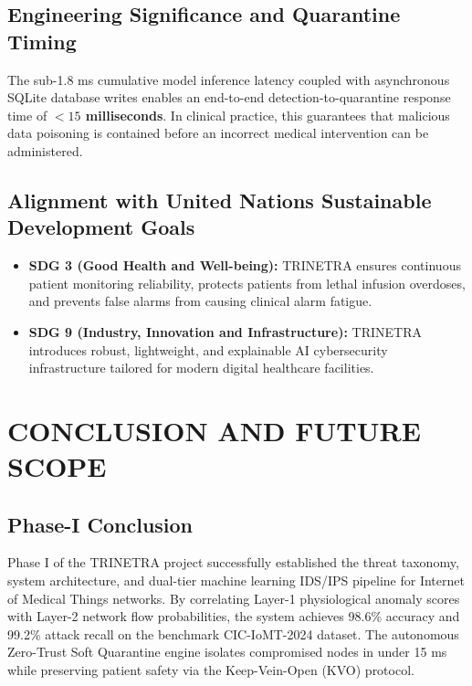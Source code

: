\documentclass[12pt,a4paper]{report}
\begin{document}
\section{Engineering Significance and Quarantine Timing}
The sub-1.8 ms cumulative model inference latency coupled with asynchronous SQLite database writes enables an end-to-end detection-to-quarantine response time of \textbf{$<15$ milliseconds}. In clinical practice, this guarantees that malicious data poisoning is contained before an incorrect medical intervention can be administered.

\section{Alignment with United Nations Sustainable Development Goals}
\begin{itemize}
    \item \textbf{SDG 3 (Good Health and Well-being):} TRINETRA ensures continuous patient monitoring reliability, protects patients from lethal infusion overdoses, and prevents false alarms from causing clinical alarm fatigue.
    \item \textbf{SDG 9 (Industry, Innovation and Infrastructure):} TRINETRA introduces robust, lightweight, and explainable AI cybersecurity infrastructure tailored for modern digital healthcare facilities.
\end{itemize}

\chapter{CONCLUSION AND FUTURE SCOPE}

\section{Phase-I Conclusion}
Phase I of the TRINETRA project successfully established the threat taxonomy, system architecture, and dual-tier machine learning IDS/IPS pipeline for Internet of Medical Things networks. By correlating Layer-1 physiological anomaly scores with Layer-2 network flow probabilities, the system achieves 98.6\% accuracy and 99.2\% attack recall on the benchmark CIC-IoMT-2024 dataset. The autonomous Zero-Trust Soft Quarantine engine isolates compromised nodes in under 15 ms while preserving patient safety via the Keep-Vein-Open (KVO) protocol.
\end{document}
